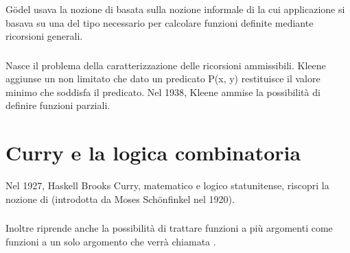 G\"odel usava la nozione di  basata
sulla nozione informale di  la cui
applicazione si basava su una  del tipo
necessario per calcolare funzioni definite mediante ricorsioni generali.
\subsubsection{}
Nasce il problema della caratterizzazione delle ricorsioni ammissibili.
Kleene aggiunse un  non limitato
che dato un predicato P(x, y) restituisce il valore minimo che soddisfa
il predicato. 
Nel 1938, Kleene ammise la possibilità di definire funzioni
parziali.

\section{Curry e la logica combinatoria}

Nel 1927, Haskell Brooks Curry, matematico e logico statunitense,
riscopri la nozione di  (introdotta da
Moses Sch\"onfinkel nel 1920).




\subsubsection*{}

Inoltre riprende anche la possibilità di trattare funzioni a più argomenti
come funzioni a un solo argomento che verrà chiamata .


